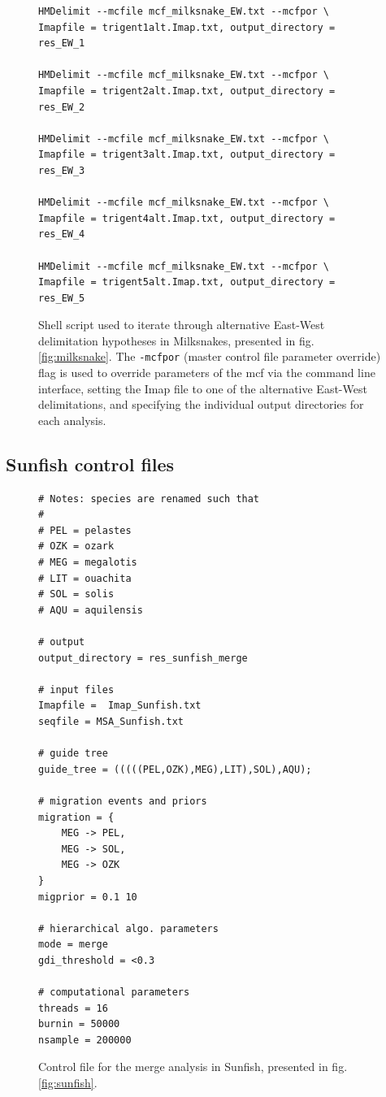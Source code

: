 \documentclass[A4]{article1}
\begin{document}
\begin{figure}[h]
	\footnotesize
	\begin{verbatim}
HMDelimit --mcfile mcf_milksnake_EW.txt --mcfpor \
Imapfile = trigent1alt.Imap.txt, output_directory = res_EW_1 

HMDelimit --mcfile mcf_milksnake_EW.txt --mcfpor \
Imapfile = trigent2alt.Imap.txt, output_directory = res_EW_2 

HMDelimit --mcfile mcf_milksnake_EW.txt --mcfpor \
Imapfile = trigent3alt.Imap.txt, output_directory = res_EW_3 

HMDelimit --mcfile mcf_milksnake_EW.txt --mcfpor \
Imapfile = trigent4alt.Imap.txt, output_directory = res_EW_4 

HMDelimit --mcfile mcf_milksnake_EW.txt --mcfpor \
Imapfile = trigent5alt.Imap.txt, output_directory = res_EW_5
	\end{verbatim}
	
	\caption{Shell script used to iterate through alternative East-West delimitation hypotheses in Milksnakes, presented in fig. \ref{fig:milksnake}. The \texttt{-mcfpor} (master control file parameter override)
	flag is used to override parameters of the mcf via the command line interface, setting the Imap file to one of the alternative East-West delimitations, and specifying the individual output directories for each analysis. %
	} \label{fig:milksnake_EW_shell}
\end{figure}


\clearpage
\newpage
\subsection{Sunfish control files}

\begin{figure}[h]
	\footnotesize
	\begin{verbatim}
# Notes: species are renamed such that
#
# PEL = pelastes
# OZK = ozark
# MEG = megalotis
# LIT = ouachita
# SOL = solis
# AQU = aquilensis

# output
output_directory = res_sunfish_merge

# input files
Imapfile =  Imap_Sunfish.txt
seqfile = MSA_Sunfish.txt

# guide tree
guide_tree = (((((PEL,OZK),MEG),LIT),SOL),AQU);

# migration events and priors
migration = {
    MEG -> PEL,
    MEG -> SOL,
    MEG -> OZK
}
migprior = 0.1 10

# hierarchical algo. parameters
mode = merge
gdi_threshold = <0.3

# computational parameters
threads = 16
burnin = 50000
nsample = 200000
	\end{verbatim}
	
	\caption{Control file for the merge analysis in Sunfish, presented in fig. \ref{fig:sunfish}. %
	} \label{fig:sunfish_mcf_merge}
\end{figure}
\end{document}
